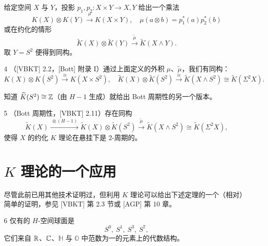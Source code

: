 给定空间 $X$ 与 $Y$，投影 $p_1,p_2:X\times Y\to X,Y$ 给出一个乘法
\[
K(X)\otimes K(Y)\xrightarrow{\ \mu\ }K(X\times Y),\quad \mu(a\otimes b)=p_1^*(a)p_2^*(b)
\]
或在约化的情形
\[ \widetilde{K}(X)\otimes\widetilde{K}(Y)\xrightarrow{\ \tilde\mu\ }\widetilde{K}(X\wedge Y). \]
取 $Y=S^2$ 便得到同构。

\begin{thm}{4}
  （[VBKT] 2.2，[Bott] 附录 I）通过上面定义的外积 $\mu$、$\tilde\mu$，我们有同构：
  \[
  K(X)\otimes K(S^2)\xrightarrow{\ \cong\ }K(X\times S^2),\quad
  \widetilde{K}(X)\otimes\widetilde{K}(S^2)\xrightarrow{\ \cong\ }\widetilde{K}(X\wedge S^2)\cong\widetilde{K}(\Sigma^2X).
  \]
\end{thm}

知道 $\widetilde{K}(S^2)\cong\mathbb{Z}$（由 $H-1$ 生成）就给出 Bott 周期性的另一个版本。

\begin{thm}{5}
  （Bott 周期性，[VBKT] 2.11）存在同构
  \[
  \widetilde{K}(X)\xrightarrow{\ \otimes(H-1)\ }\widetilde{K}(X)\otimes\widetilde{K}(S^2)
  \xrightarrow{\ \tilde\mu\ }\widetilde{K}(X\wedge S^2)\cong\widetilde{K}(\Sigma^2X),
  \]
  使得 $X$ 的约化 $K$ 理论在悬挂下是 2-周期的。
\end{thm}

\section{$K$ 理论的一个应用}

尽管此前已用其他技术证明过，但利用 $K$ 理论可以给出下述定理的一个（相对）简单的证明，参见 [VBKT] 第 2.3 节或 [AGP] 第 10 章。

\begin{thm}{6}
  仅有的 $H$-空间球面是
  \[ S^0,\ S^1,\ S^3,\ S^7, \]
  它们来自 $\mathbb{R}$、$\mathbb{C}$、$\mathbb{H}$ 与 $\mathbb{O}$ 中范数为一的元素上的代数结构。
\end{thm}
